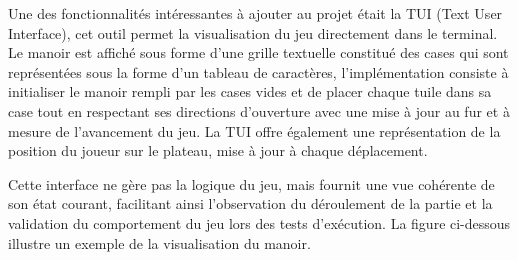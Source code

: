 Une des fonctionnalités intéressantes à ajouter au projet était la TUI (Text User Interface), cet outil permet la visualisation du jeu directement dans le terminal.
Le manoir est affiché sous forme d'une grille textuelle constitué des cases qui sont représentées sous la forme d'un tableau de caractères, l'implémentation consiste à initialiser le manoir rempli par les cases vides et de placer chaque tuile dans sa case tout en respectant ses directions d'ouverture avec une mise à jour au fur et à mesure de l'avancement du jeu. La TUI offre également une représentation de la position du joueur sur le plateau, mise à jour à chaque déplacement.

Cette interface ne gère pas la logique du jeu, mais fournit une vue cohérente de son état courant, facilitant ainsi l’observation du déroulement de la partie et la validation du comportement du jeu lors des tests d'exécution. La figure ci-dessous illustre un exemple de la visualisation du manoir.




